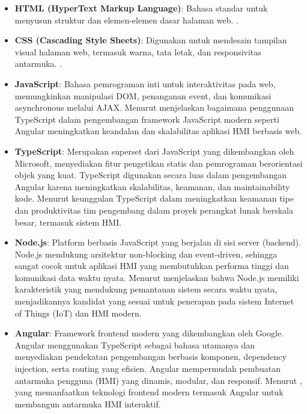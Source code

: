 \begin{itemize}
    \item \textbf{HTML (HyperText Markup Language)}: Bahasa standar untuk menyusun struktur dan elemen-elemen dasar halaman web. \textcite{bhanarkar2023responsive}.

    \item \textbf{CSS (Cascading Style Sheets)}: Digunakan untuk mendesain tampilan visual halaman web, termasuk warna, tata letak, dan responsivitas antarmuka. \textcite{singh2014responsive}.

    \item \textbf{JavaScript}: Bahasa pemrograman inti untuk interaktivitas pada web, memungkinkan manipulasi DOM, penanganan event, dan komunikasi asynchronous melalui AJAX. Menurut \textcite{emmanni2025typescript} menjelaskan bagaimana penggunaan TypeScript dalam pengembangan framework JavaScript modern seperti Angular meningkatkan keandalan dan skalabilitas aplikasi HMI berbasis web.

    \item \textbf{TypeScript}: Merupakan superset dari JavaScript yang dikembangkan oleh Microsoft, menyediakan fitur pengetikan statis dan pemrograman berorientasi objek yang kuat. TypeScript digunakan secara luas dalam pengembangan Angular karena meningkatkan skalabilitas, keamanan, dan maintainability kode. Menurut \textcite{scarsbrook2023typescript} keunggulan TypeScript dalam meningkatkan keamanan tipe dan produktivitas tim pengembang dalam proyek perangkat lunak berskala besar, termasuk sistem HMI.

    \item \textbf{Node.js}: Platform berbasis JavaScript yang berjalan di sisi server (backend). Node.js mendukung arsitektur non-blocking dan event-driven, sehingga sangat cocok untuk aplikasi HMI yang membutuhkan performa tinggi dan komunikasi data waktu nyata. Menurut \textcite{ancona2018nodejs} menjelaskan bahwa Node.js memiliki karakteristik yang mendukung pemantauan sistem secara waktu nyata, menjadikannya kandidat yang sesuai untuk penerapan pada sistem Internet of Things (IoT) dan HMI modern.

    \item \textbf{Angular}: Framework frontend modern yang dikembangkan oleh Google. Angular menggunakan TypeScript sebagai bahasa utamanya dan menyediakan pendekatan pengembangan berbasis komponen, dependency injection, serta routing yang efisien. Angular mempermudah pembuatan antarmuka pengguna (HMI) yang dinamis, modular, dan responsif. Menurut \textcite{jointjs2023scada}, yang memanfaatkan teknologi frontend modern termasuk Angular untuk membangun antarmuka HMI interaktif.

\end{itemize}

